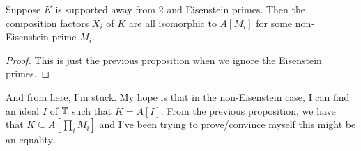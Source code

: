 \documentclass{article}
\begin{document}
\begin{proposition}
    Suppose $K$ is supported away from 2 and Eisenstein primes. Then the
    composition factors $X_i$ of $K$ are all isomorphic to $A[M_i]$ for some
    non-Eisenstein prime $M_i$.
\end{proposition}
\begin{proof}
    This is just the previous proposition when we ignore the Eisenstein primes.
\end{proof}

And from here, I'm stuck. My hope is that in the non-Eisenstein case, I can find
an ideal $I$ of $\mathbb{T}$ such that $K=A[I]$. From the previous proposition, 
we have that $K \subseteq A[\prod_i M_i]$ and I've been trying to
prove/convince myself this might be an equality.


\end{document}
